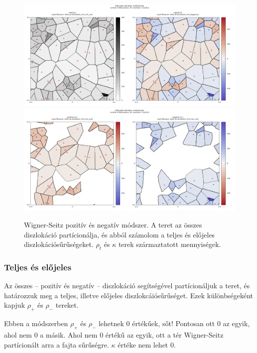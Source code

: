 \documentclass[10pt,a4paper]{scrartcl}
\begin{document}
\begin{center}
\begin{figure}
\includegraphics[width=\textwidth]{"../xpattern/example_with_64_dislocations/1000_64.dconfwsts_r512_ts.txt"}
\includegraphics[width=\textwidth]{"../xpattern/example_with_64_dislocations/1000_64.dconfwsts_r512_pn.txt"}
\caption{Wigner-Seitz pozitív és negatív módszer. A teret az összes diszlokáció partícionálja, és abból számolom a teljes és előjeles diszlokációsűrűségeket. $\rho_t$ és $\kappa$ terek származtatott mennyiségek.}
\end{figure}
\end{center}

\subsubsection{Teljes és előjeles}
Az összes -- pozitív és negatív -- diszlokáció segítségével partícionáljuk a teret, és határozzuk meg a teljes, illetve előjeles diszlokcáiósűrűséget. Ezek különbségeként kapjuk $\rho_+$ és $\rho_-$ tereket.

Ebben a módszerben $\rho_+$ és $\rho_-$ lehetnek 0 értékűek, sőt! Pontosan ott 0 az egyik, ahol nem 0 a másik. Ahol nem 0 értékű az egyik, ott a tér Wigner-Seitz partícionált arra a fajta sűrűségre. $\kappa$ értéke nem lehet 0.
\end{document}

